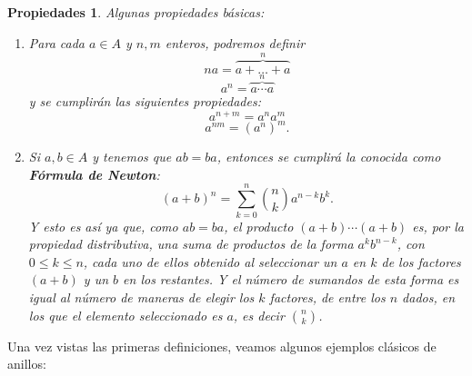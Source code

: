 \documentclass[12pt]{article}
\newtheorem{properties}{Propiedades}[theorem]
\begin{document}
\begin{properties}Algunas propiedades básicas: \begin{enumerate}
\item Para cada $a \in A$ y $n,m$ enteros, podremos definir $$na = \overbrace{a+ \ldots +a}^{n}$$ $$a^{n} = \overbrace{a \cdots a}^{n}$$ y se cumplirán las siguientes propiedades: $$a^{n+m} = a^{n}a^{m}$$ $$a^{nm} = (a^{n})^{m}.$$
\item Si $a,b \in A$ y tenemos que $ab = ba$, entonces se cumplirá la conocida como \textbf{Fórmula de Newton}:
$$(a+b)^{n} = \sum_{k=0}^{n} {n \choose k}a^{n-k}b^{k}.$$ Y esto es así ya que, como $ab = ba$, el producto $(a+b)\cdots(a+b)$ es, por la propiedad distributiva, una suma de productos de la forma $a^{k}b^{n-k}$, con $0 \leq k \leq n$, cada uno de ellos obtenido al seleccionar un $a$ en $k$ de los factores $(a+b)$ y un $b$ en los restantes. Y el número de sumandos de esta forma es igual al número de maneras de elegir los $k$ factores, de entre los $n$ dados, en los que el elemento seleccionado es $a$, es decir ${n \choose k}$.
\end{enumerate} 
\end{properties}

Una vez vistas las primeras definiciones, veamos algunos ejemplos clásicos de anillos:
\end{document}
